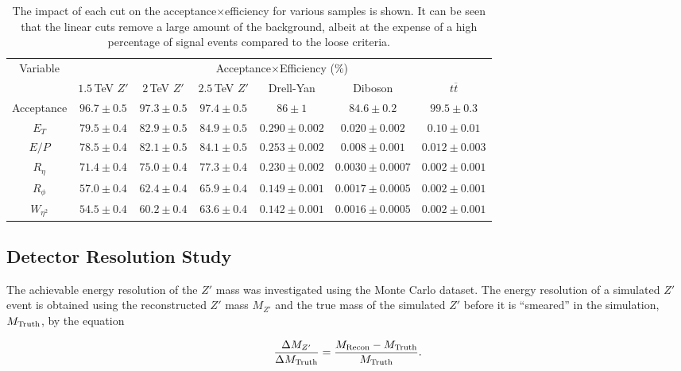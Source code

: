 \documentclass{article}
\begin{document}
\begin{table}[h!t]
\centering
\caption{The impact of each cut on the acceptance$\times$efficiency for various samples is shown. It can be seen that the linear cuts remove a large amount of the background, albeit at the expense of a high percentage of signal events compared to the loose criteria. \label{table:linearCutEfficiencies}}
\begin{tabular}{|c|c|c|c|c|c|c| } 
\hline
\multirow{2}{*}{Variable} & \multicolumn{6}{|c|}{Acceptance$\times$Efficiency ($\%$)}\\\cline{2-7}
& $1.5\,$TeV $Z'$ & $2\,$TeV $Z'$ & $2.5\,$TeV $Z'$ & Drell-Yan & Diboson & $t\overline{t}$ \\\hline
Acceptance  & $96.7\pm0.5$ & $97.3\pm0.5$ & $97.4\pm0.5$ & $86\pm1$ & $84.6\pm0.2$ & $99.5\pm0.3$\\\hline
$E_T$ & $79.5\pm0.4$ & $82.9\pm0.5$ & $84.9\pm0.5$ & $0.290\pm0.002$ & $0.020\pm0.002$ & $0.10\pm0.01$\\\hline
$E/P$ &  $78.5\pm0.4$ & $82.1\pm0.5$ & $84.1\pm0.5$ & $0.253\pm0.002$ & $0.008\pm0.001$ & $0.012\pm0.003$ \\\hline
$R_{\eta}$ &  $71.4\pm0.4$ & $75.0\pm0.4$ & $77.3\pm0.4$ & $0.230\pm0.002$ & $0.0030\pm0.0007$ & $0.002\pm0.001$\\\hline
$R_{\phi}$ & $57.0\pm0.4$ & $62.4\pm0.4$ & $65.9\pm0.4$ & $0.149\pm0.001$ & $0.0017\pm0.0005$ & $0.002\pm0.001$\\\hline
$W_{\eta^2}$ & $54.5\pm0.4$ & $60.2\pm0.4$ & $63.6\pm0.4$ & $0.142\pm0.001$ & $0.0016\pm0.0005$ & $0.002\pm0.001$ \\\hline
\end{tabular}
\end{table}


\subsection{Detector Resolution Study}
\label{sec:MCA_resolution}



The achievable energy resolution of the $Z'$ mass was investigated using the Monte Carlo dataset. The energy resolution of a simulated $Z'$ event is obtained using the reconstructed $Z'$ mass $M_{Z'}$ and the true mass of the simulated $Z'$ before it is ``smeared'' in the simulation, $M_{\rm{Truth}}$, by the equation

\begin{equation}
\frac{\Delta M_{Z'}}{\Delta M_{\rm{Truth}}} = \frac{M_{\rm{Recon}}-M_{\rm{Truth}}}{M_{\rm{Truth}}}.
\end{equation}
\end{document}
